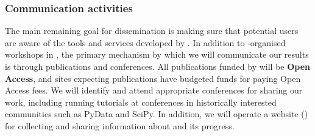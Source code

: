 \subsubsection{Communication activities}

The main remaining goal for dissemination is making sure that potential users are aware of the tools and services developed by \TheProject.
In addition to \TheProject-organised workshops in ,
the primary mechanism by which we will communicate our results is through publications and conferences.
All publications funded by \TheProject will be \textbf{Open Access},
and sites expecting publications have budgeted funds for paying Open Access fees.
We will identify and attend appropriate conferences for sharing our work,
including running tutorials at conferences in historically interested communities such as PyData and SciPy. In addition, we will operate a website ()
for collecting and sharing information about \TheProject and its progress.
